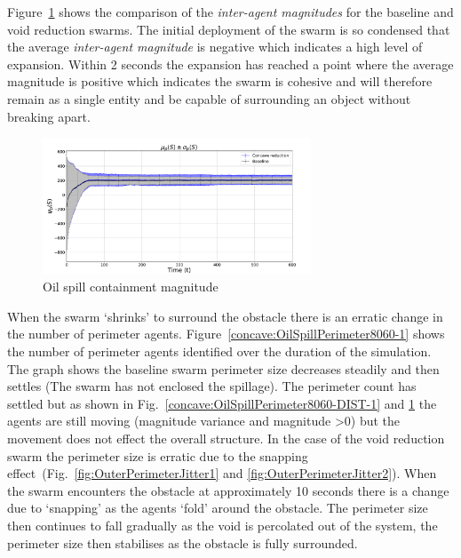 \documentclass[preprint,12pt]{elsarticle}
\begin{document}
Figure~\ref{concave:OilSpillPerimeter8060-MAG-1} shows the comparison of the \textit{inter-agent magnitudes} for the baseline and void reduction swarms. The initial deployment of the swarm is so condensed that the average \textit{inter-agent magnitude} is negative which indicates a high level of expansion. Within 2 seconds the expansion has reached a point where the average magnitude is positive which indicates the swarm is cohesive and will therefore remain as a single entity and be capable of surrounding an object without breaking apart.
\begin{figure}
\begin{center}
\includegraphics[width=8cm]{figures/OilSpillPerimeter8060-MAG-1}
\end{center}
\caption{Oil spill containment magnitude\label{concave:OilSpillPerimeter8060-MAG-1}}
\end{figure}
When the swarm `shrinks' to surround the obstacle there is an erratic change in the number of perimeter agents. Figure~\ref{concave:OilSpillPerimeter8060-1} shows the number of perimeter agents identified over the duration of the simulation. The graph shows the baseline swarm perimeter size decreases steadily and then settles (The swarm has not enclosed the spillage). The perimeter count has settled but as shown in Fig.~\ref{concave:OilSpillPerimeter8060-DIST-1} and \ref{concave:OilSpillPerimeter8060-MAG-1} the agents are still moving (magnitude variance and magnitude \textgreater 0) but the movement does not effect the overall structure. 
In the case of the void reduction swarm the perimeter size is erratic due to the snapping effect~(Fig.~\ref{fig:OuterPerimeterJitter1} and \ref{fig:OuterPerimeterJitter2}). When the swarm encounters the obstacle at approximately 10 seconds there is a change due to `snapping' as the agents `fold' around the obstacle. The perimeter size then continues to fall gradually as the void is percolated out of the system, the perimeter size then stabilises as the obstacle is fully surrounded.
\end{document}
